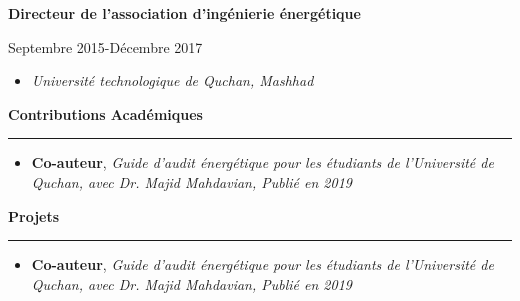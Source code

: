 \documentclass[a4paper]{letter}
\newcommand{\divider}{\rule{\linewidth}{0.9pt}}
\begin{document}
\begin{minipage}[t]{0.60\textwidth}
\vspace{3mm}

{\textbf{Directeur de l'association d'ingénierie énergétique}}

{\footnotesize Septembre 2015-Décembre 2017}
\begin{itemize}
   \footnotesize \item \textit{Université technologique de Quchan, Mashhad}
\end{itemize}



\vspace{0.8cm}


{\large \textbf{Contributions Académiques}}
\divider
\vspace{4mm}
\begin{itemize}
    \footnotesize \item {\textbf{Co-auteur}, \textit{Guide d’audit énergétique pour les étudiants de l’Université de Quchan, avec Dr. Majid Mahdavian, Publié en 2019}}


\end{itemize}

\vspace{3mm}



{\large \textbf{Projets}}
\divider
\vspace{4mm}
\begin{itemize}
    \footnotesize \item {\textbf{Co-auteur}, \textit{Guide d’audit énergétique pour les étudiants de l’Université de Quchan, avec Dr. Majid Mahdavian, Publié en 2019}}


\end{itemize}

\vspace{3mm}

\end{minipage}

\end{document}
